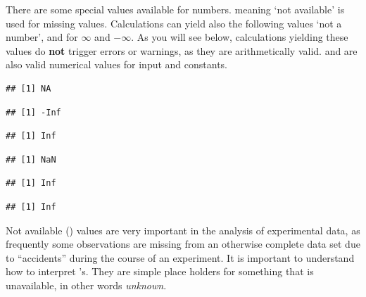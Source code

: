 \documentclass[krantz2]{krantz}\usepackage{knitr}%
\begin{document}
There are some special values available for numbers.  meaning `not available' is used for missing values. Calculations can yield also the following values  `not a number',  and  for $\infty$ and $-\infty$. As you will see below, calculations yielding these values do \textbf{not} trigger errors or warnings, as they are arithmetically valid.  and  are also valid numerical values for input and constants.

\begin{knitrout}\footnotesize
{}\color{fgcolor}\begin{kframe}
\begin{alltt}
 \hlkwb{<-} 
\end{alltt}
\begin{verbatim}
## [1] NA
\end{verbatim}
\begin{alltt}
\hlopt{-} \hlopt{/} 
\end{alltt}
\begin{verbatim}
## [1] -Inf
\end{verbatim}
\begin{alltt}
 \hlopt{/} 
\end{alltt}
\begin{verbatim}
## [1] Inf
\end{verbatim}
\begin{alltt}
 \hlopt{/} 
\end{alltt}
\begin{verbatim}
## [1] NaN
\end{verbatim}
\begin{alltt}
 \hlopt{+} 
\end{alltt}
\begin{verbatim}
## [1] Inf
\end{verbatim}
\begin{alltt}
 \hlkwb{<-} \hlopt{-}
 \hlopt{* -}
\end{alltt}
\begin{verbatim}
## [1] Inf
\end{verbatim}
\end{kframe}
\end{knitrout}

Not available () values are very important in the analysis of experimental data, as frequently some observations are missing from an otherwise complete data set due to ``accidents'' during the course of an experiment. It is important to understand how to interpret 's. They are simple place holders for something that is unavailable, in other words \emph{unknown}.
\end{document}
